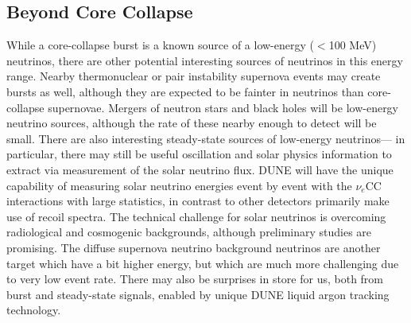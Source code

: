 \subsection{Beyond Core Collapse}
While a core-collapse burst is a known source of a
low-energy ($<$100 MeV) neutrinos, there are other potential
interesting sources of neutrinos in this energy range.  Nearby
thermonuclear or pair instability supernova events may create bursts
as well, although they are expected to be fainter in neutrinos than
core-collapse supernovae.  Mergers of neutron stars and black holes
will be low-energy neutrino sources, although the rate of these nearby
enough to detect will be small.  There are also interesting
steady-state sources of low-energy neutrinos--- in particular, there
may still be useful oscillation and solar physics information to
extract via measurement of the solar neutrino flux. DUNE will have the
unique capability of measuring solar neutrino energies event by event
with the $\nu_e$CC interactions with large statistics, in contrast to
other detectors primarily make use of recoil spectra.  The technical
challenge for solar neutrinos is overcoming radiological and
cosmogenic backgrounds, although preliminary studies are promising.
The diffuse supernova neutrino background neutrinos are another target
which have a bit higher energy, but which are much more challenging due to very low
event rate.  There may also be surprises in store for us, both from burst
and steady-state signals, enabled by unique DUNE liquid argon tracking
technology.












